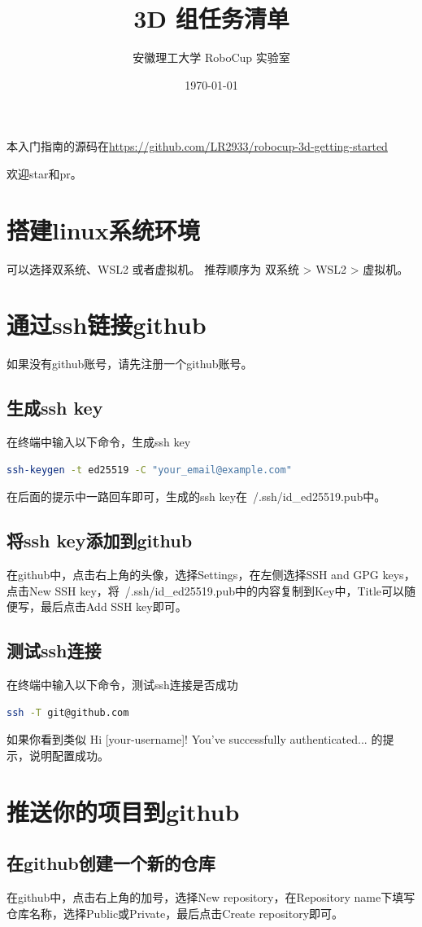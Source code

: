 \documentclass[11pt, UTF8, a4paper]{ctexart} %
\title{\textbf{3D 组任务清单}}
\author{安徽理工大学 RoboCup 实验室}
\date{\today}
\begin{document}
\maketitle

本入门指南的源码在\url{https://github.com/LR2933/robocup-3d-getting-started}

欢迎star和pr。
\tableofcontents %
\vspace{5cm} 
\newpage
\section{搭建linux系统环境}
可以选择双系统、WSL2 或者虚拟机。
\smallbreak
推荐顺序为 双系统 > WSL2 > 虚拟机。
\section{通过ssh链接github}
如果没有github账号，请先注册一个github账号。
\subsection{生成ssh key}
在终端中输入以下命令，生成ssh key
\begin{lstlisting}[language=bash]
ssh-keygen -t ed25519 -C "your_email@example.com"
\end{lstlisting}
\smallbreak
在后面的提示中一路回车即可，生成的ssh key在~/.ssh/id\_ed25519.pub中。
\subsection{将ssh key添加到github}
在github中，点击右上角的头像，选择Settings，在左侧选择SSH and GPG keys，点击New SSH key，将~/.ssh/id\_ed25519.pub中的内容复制到Key中，Title可以随便写，最后点击Add SSH key即可。
\subsection{测试ssh连接}
在终端中输入以下命令，测试ssh连接是否成功
\begin{lstlisting}[language=bash]
ssh -T git@github.com
\end{lstlisting}
\smallbreak
如果你看到类似 Hi [your-username]! You've successfully authenticated... 的提示，说明配置成功。

\section{推送你的项目到github}
\subsection{在github创建一个新的仓库}
在github中，点击右上角的加号，选择New repository，在Repository name下填写仓库名称，选择Public或Private，最后点击Create repository即可。
\end{document}
